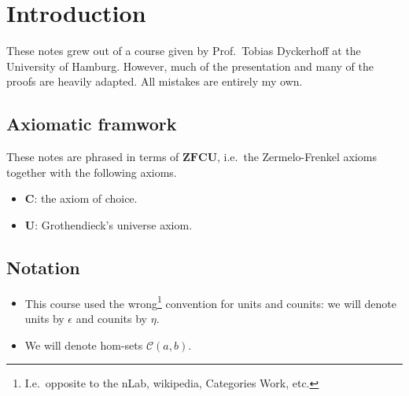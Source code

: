 \documentclass[main.tex]{subfiles}
\begin{document}
\chapter{Introduction}
\label{ch:introduction}

These notes grew out of a course given by Prof.\ Tobias Dyckerhoff at the University of Hamburg. However, much of the presentation and many of the proofs are heavily adapted. All mistakes are entirely my own.

\section{Axiomatic framwork}
\label{sec:axiomatic_framwork}

These notes are phrased in terms of $\mathbf{ZFCU}$, i.e.\ the Zermelo-Frenkel axioms together with the following axioms.
\begin{itemize}
  \item $\mathbf{C}$: the axiom of choice.

  \item $\mathbf{U}$: Grothendieck's universe axiom.
\end{itemize}

\section{Notation}
\label{sec:notation}

\begin{itemize}
  \item This course used the wrong\footnote{I.e.\ opposite to the nLab, wikipedia, Categories Work, etc.} convention for units and counits: we will denote units by $\epsilon$ and counits by $\eta$.

  \item We will denote hom-sets $\mathcal{C}(a, b)$.
\end{itemize}
\end{document}
